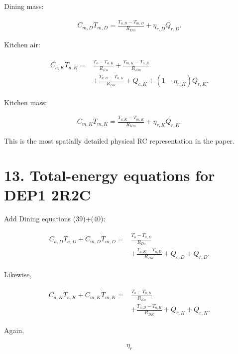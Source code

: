 \documentclass[11pt]{article}
\begin{document}
Dining mass:

\begin{align}
\boxed{
C_{m,D}\dot T_{m,D}
=
\frac{T_{a,D}-T_{m,D}}{R_{Dm}}
+
\eta_{r,D}Q_{r,D}.
}
\tag{40}
\end{align}

Kitchen air:

\begin{align}
\boxed{
\begin{aligned}
C_{a,K}\dot T_{a,K}
={}&
\frac{T_o-T_{a,K}}{R_{Ko}}
+
\frac{T_{m,K}-T_{a,K}}{R_{Km}}\\
&+
\frac{T_{a,D}-T_{a,K}}{R_{DK}}
+
Q_{c,K}
+
(1-\eta_{r,K})Q_{r,K}.
\end{aligned}
}
\tag{41}
\end{align}

Kitchen mass:

\begin{align}
\boxed{
C_{m,K}\dot T_{m,K}
=
\frac{T_{a,K}-T_{m,K}}{R_{Km}}
+
\eta_{r,K}Q_{r,K}.
}
\tag{42}
\end{align}

This is the most spatially detailed physical RC representation in the paper.

\section*{13. Total-energy equations for DEP1 2R2C}

Add Dining equations (39)+(40):

\begin{align}
\boxed{
\begin{aligned}
C_{a,D}\dot T_{a,D}
+
C_{m,D}\dot T_{m,D}
={}&
\frac{T_o-T_{a,D}}{R_{Do}}\\
&+
\frac{T_{a,K}-T_{a,D}}{R_{DK}}
+
Q_{c,D}+Q_{r,D}.
\end{aligned}
}
\tag{43}
\end{align}

Likewise,

\begin{align}
\boxed{
\begin{aligned}
C_{a,K}\dot T_{a,K}
+
C_{m,K}\dot T_{m,K}
={}&
\frac{T_o-T_{a,K}}{R_{Ko}}\\
&+
\frac{T_{a,D}-T_{a,K}}{R_{DK}}
+
Q_{c,K}+Q_{r,K}.
\end{aligned}
}
\tag{44}
\end{align}

Again,

\begin{align}
\eta_r
\end{align}
\end{document}
